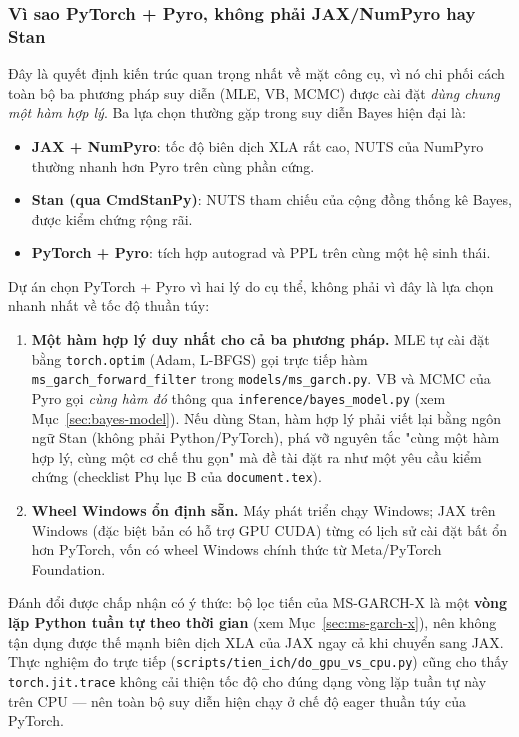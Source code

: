 \documentclass[11pt,a4paper]{article}
\newcommand{\code}[1]{\texttt{#1}}
\newcommand{\file}[1]{\texttt{#1}}
\begin{document}
\subsubsection{Vì sao PyTorch + Pyro, không phải JAX/NumPyro hay Stan}

Đây là quyết định kiến trúc quan trọng nhất về mặt công cụ, vì nó chi phối cách toàn
bộ ba phương pháp suy diễn (MLE, VB, MCMC) được cài đặt \emph{dùng chung một hàm hợp
lý}. Ba lựa chọn thường gặp trong suy diễn Bayes hiện đại là:

\begin{itemize}
  \item \textbf{JAX + NumPyro}: tốc độ biên dịch XLA rất cao, NUTS của NumPyro
    thường nhanh hơn Pyro trên cùng phần cứng.
  \item \textbf{Stan (qua CmdStanPy)}: NUTS tham chiếu của cộng đồng thống kê Bayes,
    được kiểm chứng rộng rãi.
  \item \textbf{PyTorch + Pyro}: tích hợp autograd và PPL trên cùng một hệ sinh thái.
\end{itemize}

Dự án chọn PyTorch + Pyro vì hai lý do cụ thể, không phải vì đây là lựa chọn nhanh
nhất về tốc độ thuần túy:

\begin{enumerate}
  \item \textbf{Một hàm hợp lý duy nhất cho cả ba phương pháp.} MLE tự cài đặt bằng
    \code{torch.optim} (Adam, L-BFGS) gọi trực tiếp hàm
    \code{ms\_garch\_forward\_filter} trong \code{models/ms\_garch.py}. VB và MCMC
    của Pyro gọi \emph{cùng hàm đó} thông qua \code{inference/bayes\_model.py}
    (xem Mục~\ref{sec:bayes-model}). Nếu dùng Stan, hàm hợp lý phải viết lại bằng
    ngôn ngữ Stan (không phải Python/PyTorch), phá vỡ nguyên tắc "cùng một hàm hợp
    lý, cùng một cơ chế thu gọn" mà đề tài đặt ra như một yêu cầu kiểm chứng
    (checklist Phụ lục B của \file{document.tex}).
  \item \textbf{Wheel Windows ổn định sẵn.} Máy phát triển chạy Windows;
    JAX trên Windows (đặc biệt bản có hỗ trợ GPU CUDA) từng có lịch sử cài đặt bất
    ổn hơn PyTorch, vốn có wheel Windows chính thức từ Meta/PyTorch Foundation.
\end{enumerate}

Đánh đổi được chấp nhận có ý thức: bộ lọc tiến của MS-GARCH-X là một \textbf{vòng lặp
Python tuần tự theo thời gian} (xem Mục~\ref{sec:ms-garch-x}), nên không tận dụng
được thế mạnh biên dịch XLA của JAX ngay cả khi chuyển sang JAX. Thực nghiệm đo trực
tiếp (\file{scripts/tien\_ich/do\_gpu\_vs\_cpu.py}) cũng cho thấy \code{torch.jit.trace}
không cải thiện tốc độ cho đúng dạng vòng lặp tuần tự này trên CPU --- nên toàn bộ
suy diễn hiện chạy ở chế độ eager thuần túy của PyTorch.
\end{document}
